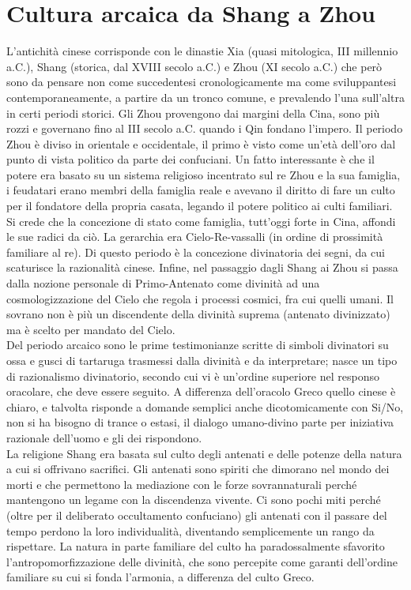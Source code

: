 \documentclass[10pt,a4paper]{report}
\begin{document}
\section{Cultura arcaica da Shang a Zhou}
L'antichità cinese corrisponde con le dinastie Xia (quasi mitologica, III millennio a.C.), Shang (storica, dal XVIII secolo a.C.) e Zhou (XI secolo a.C.) che però sono da pensare non come succedentesi cronologicamente ma come sviluppantesi contemporaneamente, a partire da un tronco comune, e prevalendo l'una sull'altra in certi periodi storici. Gli Zhou provengono dai margini della Cina, sono più rozzi e governano fino al III secolo a.C. quando i Qin fondano l'impero. Il periodo Zhou è diviso in orientale e occidentale, il primo è visto come un'età dell'oro dal punto di vista politico da parte dei confuciani. Un fatto interessante è che il potere era basato su un sistema religioso incentrato sul re Zhou e la sua famiglia, i feudatari erano membri della famiglia reale e avevano il diritto di fare un culto per il fondatore della propria casata, legando il potere politico ai culti familiari. Si crede che la concezione di stato come famiglia, tutt'oggi forte in Cina, affondi le sue radici da ciò. La gerarchia era Cielo-Re-vassalli (in ordine di prossimità familiare al re). Di questo periodo è la concezione divinatoria dei segni, da cui scaturisce la razionalità cinese. Infine, nel passaggio dagli Shang ai Zhou si passa dalla nozione personale di Primo-Antenato come divinità ad una cosmologizzazione del Cielo che regola i processi cosmici, fra cui quelli umani. Il sovrano non è più un discendente della divinità suprema (antenato divinizzato) ma è scelto per mandato del Cielo.\\
Del periodo arcaico sono le prime testimonianze scritte di simboli divinatori su ossa e gusci di tartaruga trasmessi dalla divinità e da interpretare; nasce un tipo di razionalismo divinatorio, secondo cui vi è un'ordine superiore nel responso oracolare, che deve essere seguito. A differenza dell'oracolo Greco quello cinese è chiaro, e talvolta risponde a domande semplici anche dicotomicamente con Si/No, non si ha bisogno di trance o estasi, il dialogo umano-divino parte per iniziativa razionale dell'uomo e gli dei rispondono.\\
La religione Shang era basata sul culto degli antenati e delle potenze della natura a cui si offrivano sacrifici. Gli antenati sono spiriti che dimorano nel mondo dei morti e che permettono la mediazione con le forze sovrannaturali perché mantengono un legame con la discendenza vivente. Ci sono pochi miti perché (oltre per il deliberato occultamento confuciano) gli antenati con il passare del tempo perdono la loro individualità, diventando semplicemente un rango da rispettare. La natura in parte familiare del culto ha paradossalmente sfavorito l'antropomorfizzazione delle divinità, che sono percepite come garanti dell'ordine familiare su cui si fonda l'armonia, a differenza del culto Greco. \\
\end{document}
